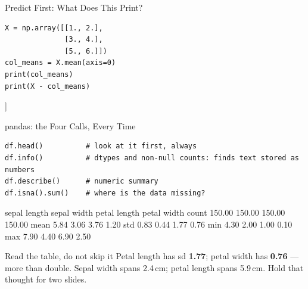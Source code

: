 \documentclass[aspectratio=169]{beamer}
\begin{document}
\begin{frame}[fragile,shrink=14]{Predict First: What Does This Print?}
  \begin{lstlisting}
X = np.array([[1., 2.],
              [3., 4.],
              [5., 6.]])
col_means = X.mean(axis=0)
print(col_means)
print(X - col_means)
  \end{lstlisting}
  \vspace{0.1em}
  \begin{outblk}
[3. 4.]
[[-2. -2.]
 [ 0.  0.]
 [ 2.  2.]]
  \end{outblk}
  \vspace{0.1em}
\end{frame}

\begin{frame}[fragile,shrink=10]{pandas: the Four Calls, Every Time}
  \begin{lstlisting}
df.head()          # look at it first, always
df.info()          # dtypes and non-null counts: finds text stored as numbers
df.describe()      # numeric summary
df.isna().sum()    # where is the data missing?
  \end{lstlisting}
  \begin{outblk}
       sepal length  sepal width  petal length  petal width
count        150.00       150.00        150.00       150.00
mean           5.84         3.06          3.76         1.20
std            0.83         0.44          1.77         0.76
min            4.30         2.00          1.00         0.10
max            7.90         4.40          6.90         2.50
  \end{outblk}
  \vspace{0.1em}
  \begin{alertblock}{Read the table, do not skip it}
    Petal length has sd \textbf{1.77}; petal width has \textbf{0.76} --- more
    than double. Sepal width spans 2.4\,cm; petal length spans 5.9\,cm. Hold
    that thought for two slides.
  \end{alertblock}
\end{frame}
\end{document}
